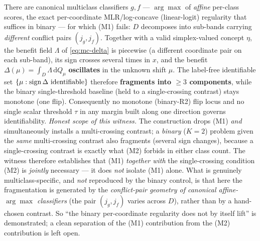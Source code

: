 \begin{theorem}\label{thm:mc-breakerM1}
There are canonical multiclass classifiers $g,f$ --- $\arg\max$ of \emph{affine}
per-class scores, the exact per-coordinate MLR/log-concave (linear-logit) regularity that
suffices in binary --- for which (M1) fails: $D$ decomposes into sub-bands carrying
\emph{different} conflict pairs $(j_g,j_f)$. Together with a valid simplex-valued concept
$\eta$, the benefit field $\Lambda$ of \eqref{eq:mc-delta} is piecewise (a different
coordinate pair on each sub-band), its sign crosses several times in $x$, and the benefit
$\Delta(\mu)=\int_D\Lambda\,\mathrm dQ_\mu$ \textbf{oscillates} in the unknown shift $\mu$.
The label-free identifiable set $\{\mu:\operatorname{sign}\Delta\text{ identifiable}\}$ therefore
\textbf{fragments into $\ge3$ components}, while the binary single-threshold baseline (held to a
single-crossing contrast) stays monotone (one flip). Consequently no monotone (binary-R2) flip
locus and no single scalar threshold $\tau$ in any margin built along one direction governs
identifiability. \emph{Honest scope of this witness.} The construction drops (M1) \emph{and}
simultaneously installs a multi-crossing contrast; a \emph{binary} ($K{=}2$) problem given the
\emph{same} multi-crossing contrast also fragments (several sign changes), because a single-crossing
contrast is exactly what (M2) forbids in either class count. The witness therefore establishes that
(M1) \emph{together with} the single-crossing condition (M2) is \emph{jointly} necessary --- it does
\emph{not} isolate (M1) alone. What is genuinely multiclass-specific, and \emph{not} reproduced by the
binary control, is that here the fragmentation is generated by the \emph{conflict-pair geometry of
canonical affine-$\arg\max$ classifiers} (the pair $(j_g,j_f)$ varies across $D$), rather than by a
hand-chosen contrast. So ``the binary per-coordinate regularity does not by itself lift'' is
demonstrated; a clean separation of the (M1) contribution from the (M2) contribution is left open.
\end{theorem}
